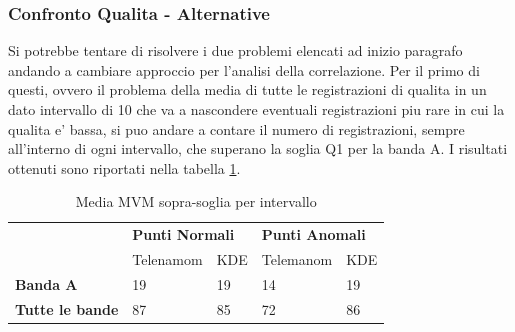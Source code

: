 \begin{table}[H]
	\begin{minipage}{.5\textwidth}
		\centering
	\end{minipage}
	\begin{minipage}{.5\textwidth}
		\centering
	\end{minipage}
\end{table}


\subsubsection{Confronto Qualita - Alternative}
Si potrebbe tentare di risolvere i due problemi elencati ad inizio paragrafo andando a cambiare approccio per l'analisi della correlazione.
Per il primo di questi, ovvero il problema della media di tutte le registrazioni di qualita in un dato intervallo di 10 che va a nascondere eventuali registrazioni piu rare in cui la qualita e' bassa, si puo andare a contare il numero di registrazioni, sempre all'interno di ogni intervallo, che superano la soglia Q1 per la banda A.
I risultati ottenuti sono riportati nella tabella \ref{quality_count}.

\begin{table}[]
	\centering
	\begin{tabular}{|l|ll|ll|}
		\hline
		\multirow{2}{*}{}       & \multicolumn{2}{l|}{\textbf{Punti Normali}} & \multicolumn{2}{l|}{\textbf{Punti Anomali}} \\ \cline{2-5} 
		                        & \multicolumn{1}{l|}{Telenamom} & KDE & \multicolumn{1}{l|}{Telemanom} & KDE \\ \hline
		\textbf{Banda A}        & \multicolumn{1}{l|}{19}        & 19  & \multicolumn{1}{l|}{14}        & 19  \\ \hline
		\textbf{Tutte le bande} & \multicolumn{1}{l|}{87}        & 85  & \multicolumn{1}{l|}{72}        & 86  \\ \hline
	\end{tabular}
	\caption{\label{quality_count}Media MVM sopra-soglia per intervallo}
\end{table}

